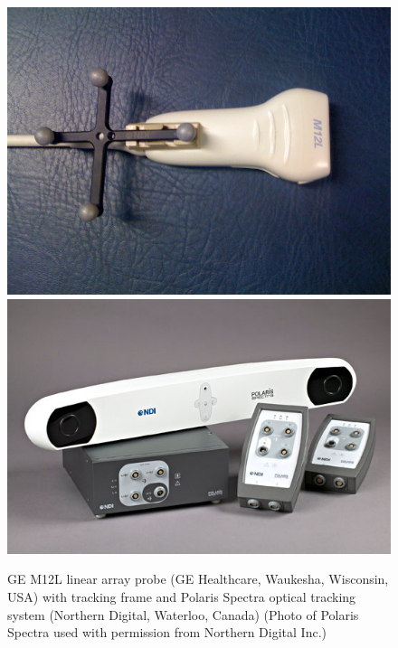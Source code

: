 	\begin{figure}[h]
	\centering
	\includegraphics[height=0.23\textheight]{graphics/tracking_system_1.png}
	\includegraphics[height=0.23\textheight]{graphics/tracking_system_2.png}
	\caption[Linear array probe and optical tracking system]{GE M12L linear array probe (GE Healthcare, Waukesha, Wisconsin, USA) with tracking frame and Polaris Spectra optical tracking system (Northern Digital, Waterloo, Canada) (Photo of Polaris Spectra used with permission from Northern Digital Inc.)}
	\label{fig:tracking_system}
	\end{figure}